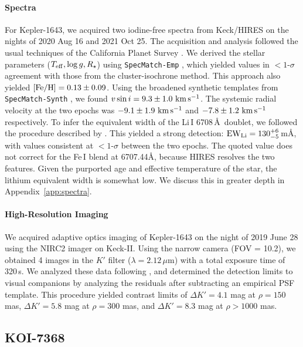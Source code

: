 \documentclass[12pt,twocolumn]{aastex63}
\newcommand{\mkms}{{\rm \,km\,s^{-1}}}  %
\begin{document}
\paragraph{Spectra}
For Kepler-1643, we acquired two iodine-free spectra from Keck/HIRES
on the nights of 2020 Aug 16 and 2021 Oct 25.  The acquisition and
analysis followed the usual techniques of the California Planet Survey
\citep{howard_cps_2010}.  We derived the stellar parameters ($T_{\rm
eff}, \log g, R_\star$) using \texttt{SpecMatch-Emp}
\citep{yee_SM_2017}, which yielded values in $<$$1$-$\sigma$ agreement
with those from the cluster-isochrone method.  This approach also
yielded $[{\rm Fe/H}]=0.13 \pm 0.09$.  Using the broadened synthetic
templates from \texttt{SpecMatch-Synth} \citep{petigura_cksi_2017}, we
found $v\sin i = 9.3 \pm 1.0\,\mkms$.  The systemic radial velocity at
the two epochs was $-9.1 \pm 1.9\,\mkms$ and $-7.8\pm
1.2\,\mkms$ respectively.  To infer the equivalent width of the
Li\,\textsc{I} 6708\,\AA\ doublet, we followed the procedure described
by \citet{bouma_2021_ngc2516}.  This yielded a strong detection: ${\rm
EW}_{\rm Li} = 130^{+6}_{-5}$\,m\AA, with values consistent at
$<$$1$-$\sigma$ between the two epochs.   The quoted value does not
correct for the Fe\,\textsc{I} blend at 6707.44\AA, because HIRES
resolves the two features.  
Given the purported age and effective temperature of the star, the
lithium equivalent width is somewhat low.  We discuss this in greater
depth in Appendix~\ref{app:spectra}.

\paragraph{High-Resolution Imaging}
We acquired adaptive optics imaging of Kepler-1643 on the night of
2019 June 28 using the NIRC2 imager on Keck-II.  Using the narrow
camera (FOV = 10.2\arcsec), we obtained 4 images in the $K'$ filter
($\lambda = 2.12\,\mu$m) with a total exposure time of 320\,s. We
analyzed these data following \citet{kraus_impact_2016}, and
determined the detection limits to visual companions by analyzing the
residuals after subtracting an empirical PSF template.  This procedure
yielded contrast limits of $\Delta K' = 4.1$ mag at $\rho = 150$ mas,
$\Delta K' = 5.8$ mag at $\rho = 300$ mas, and $\Delta K' = 8.3$ mag
at $\rho > 1000$ mas.


\subsection{KOI-7368}
\end{document}
